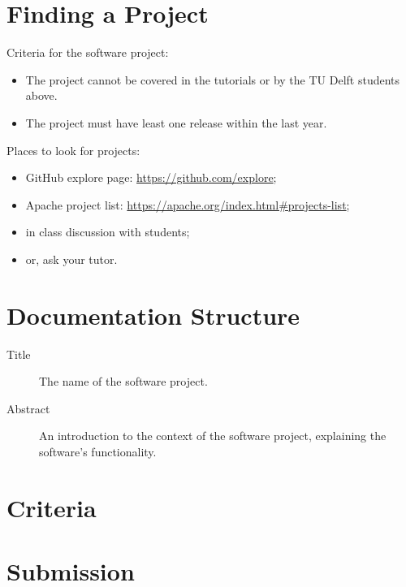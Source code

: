 \documentclass{csse4400}
\begin{document}
\section{Finding a Project}
Criteria for the software project:
\begin{itemize}
    \item The project cannot be covered in the tutorials or by the TU Delft students above.
    \item The project must have least one release within the last year.
\end{itemize}

\noindent Places to look for projects:
\begin{itemize}
    \item GitHub explore page: \url{https://github.com/explore};
    \item Apache project list: \url{https://apache.org/index.html#projects-list};
    \item in class discussion with students;
    \item or, ask your tutor.
\end{itemize}

\section{Documentation Structure}

\begin{description}
    \item[Title] The name of the software project.
    \item[Abstract] An introduction to the context of the software project, explaining the software's functionality.
\end{description}

\section{Criteria}

\section{Submission}
\end{document}
